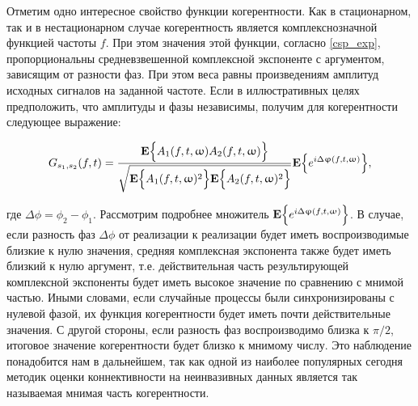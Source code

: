 Отметим одно интересное свойство функции когерентности.  Как в стационарном,
так и в нестационарном случае когерентность является комплекснозначной функцией
частоты $f$. При этом значения этой функции, согласно \ref{csp_exp},
пропорциональны средневзвешенной комплексной экспоненте с аргументом, зависящим
от разности фаз.  При этом веса равны произведениям амплитуд исходных сигналов
на заданной частоте.  Если в иллюстративных целях предположить, что амплитуды и
фазы независимы, получим для когерентности следующее выражение:

\begin{equation}
    G_{s_1,s_2}(f,t) =
    \frac{\mathbf{E}\Big\{A_1(f,t,\upomega)A_2(f,t,\upomega)\Big\}}
    {\sqrt{\mathbf{E}\Big\{A_1(f,t,\upomega)^2\Big\}\mathbf{E}\Big\{A_2(f,t,\upomega)^2\Big\}}}\mathbf{E}\Big\{e^{i\Delta\upvarphi(f,t,\upomega)}\Big\},
\end{equation}

где $\Delta\phi = \phi_2 - \phi_1$. Рассмотрим подробнее множитель
$\mathbf{E}\Big\{e^{i\Delta\upvarphi(f,t,\upomega)}\Big\}$.  В случае, если разность фаз
$\Delta\phi$ от реализации к реализации будет иметь воспроизводимые близкие к
нулю значения, средняя комплексная экспонента также будет иметь близкий к нулю
аргумент, т.е. действительная часть результирующей комплексной экспоненты будет
иметь высокое значение по сравнению с мнимой частью.  Иными словами, если
случайные процессы были синхронизированы с нулевой фазой, их функция
когерентности будет иметь почти действительные значения. С другой стороны, если
разность фаз воспроизводимо близка к $\pi/2$, итоговое значение когерентности
будет близко к мнимому числу.  Это наблюдение понадобится нам в дальнейшем, так
как одной из наиболее популярных сегодня методик оценки коннективности на
неинвазивных данных является так называемая мнимая часть когерентности.




